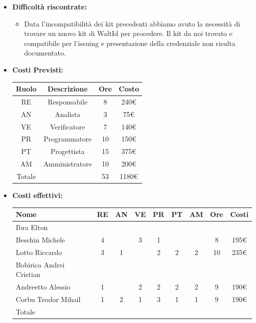 \begin{itemize}
\begin{itemize}
                
            \end{itemize}
            \item \textbf{Difficoltà riscontrate:}
             \begin{itemize}
                \item  Data l'incompatibilità dei kit precedenti abbiamo avuto la necessità di trovare un nuovo kit di WaltId per procedere. Il kit da noi trovato e compatibile per l'issuing e presentazione della credenziale non risulta documentato.
             \end{itemize}
            \item \textbf{Costi Previsti:}
            \begin{longtable}{|c|c|c|c|}
                \hline
                Ruolo & Descrizione & Ore & Costo \\
                \hline
                RE & Responsabile & 8 &  240€\\
                \hline
                AN & Analista & 3 &  75€\\
                \hline
                VE & Verificatore & 7 & 140€ \\
                \hline
                PR & Programmatore & 10 &  150€\\
                \hline
                PT & Progettista & 15 &  375€\\
                \hline
                AM & Amministratore & 10 &  200€\\
                \hline
                Totale & &  53 &  1180€\\
                \hline
                \end{longtable}
            \item \textbf{Costi effettivi:}
            \begin{longtable}{|p{}|c|c|c|c|c|c|c|c|}
                \hline
                Nome & RE & AN & VE & PR & PT & AM & Ore & Costi\\
                \hline
                Ibra \newline Elton & & & & & & & & \\
                \hline
                Beschin Michele & 4& & 3& 1& & & 8& 195€ \\
                \hline
                Lotto \newline Riccardo & 3& 1& & 2& 2& 2& 10& 235€\\
                \hline
                Bobirica Andrei Cristian & & & & & & & & \\
                \hline
                Andreetto Alessio & 1& & 2& 2& 2& 2& 9& 190€\\
                \hline
                Corbu Teodor Mihail & 1& 2& 1& 3& 1& 1& 9& 190€\\
                \hline
                Totale & & & & & & & & \\
                \hline
            \end{longtable}
            \end{itemize}


